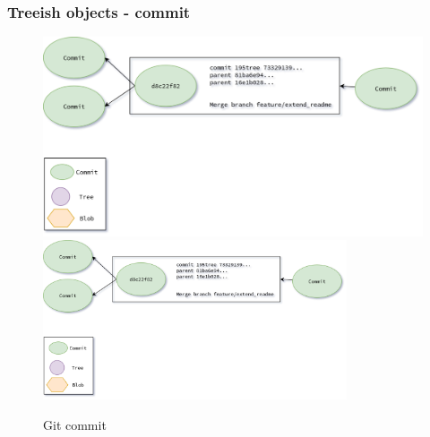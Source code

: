 \begin{frame}
    \frametitle{Treeish objects - commit}
    \begin{figure}
        \begin{center}
            {
                \includegraphics[height=0.70\textheight,keepaspectratio]{./images/Treeish_Commit.png}
            }
            {
                \includegraphics[height=0.6\textheight,width=0.8\textwidth]{./images/Treeish_Commit.png}
            }
            \caption{Git commit}
        \end{center}
    \end{figure}
\end{frame}

